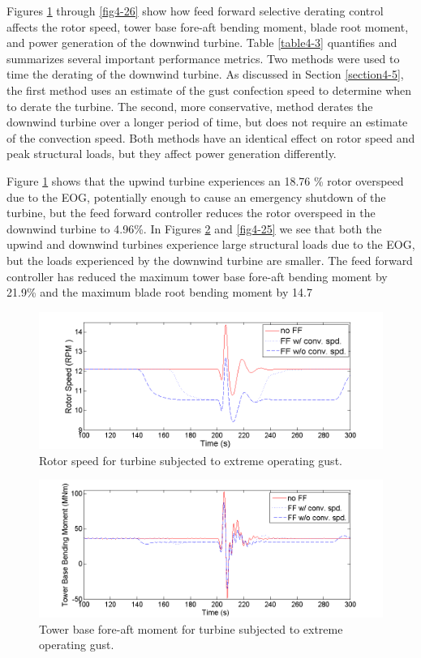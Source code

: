 Figures \ref{fig4-23} through \ref{fig4-26} show how feed forward selective derating control affects the rotor speed, tower base fore-aft bending moment, blade root moment, and power generation of the downwind turbine. Table \ref{table4-3} quantifies and summarizes several important performance metrics. Two methods were used to time the derating of the downwind turbine. As discussed in Section \ref{section4-5}, the first method uses an estimate of the gust confection speed to determine when to derate the turbine. The second, more conservative,  method derates the downwind turbine over a longer period of time, but does not require an estimate of the convection speed. Both methods have an identical effect on rotor speed and peak structural loads, but they affect power generation differently. 

Figure \ref{fig4-23} shows that the upwind turbine experiences an 18.76 \% rotor overspeed due to the EOG, potentially enough to cause an emergency shutdown of the turbine, but the feed forward controller reduces the rotor overspeed in the downwind turbine to 4.96\%. In Figures \ref{fig4-24} and \ref{fig4-25} we see that both the upwind and downwind turbines experience large structural loads due to the EOG, but the loads experienced by the downwind turbine are smaller. The feed forward controller has reduced the maximum tower base fore-aft bending moment by 21.9\% and the maximum blade root bending moment by 14.7%

\begin{figure}[htbp]
	\centering
		\includegraphics[trim = {1cm 0 2cm 0}, clip, width = \linewidth]{Figures/ch4Figures/fig4-23.png}
		
	\caption{Rotor speed for turbine subjected to extreme operating gust.}
	\label{fig4-23}
\end{figure}

\begin{figure}[htbp]
	\centering
		\includegraphics[trim = {1cm 0 2cm 0}, clip, width = \linewidth]{Figures/ch4Figures/fig4-24.png}
		
	\caption{Tower base fore-aft moment for turbine subjected to extreme operating gust.}
	\label{fig4-24}
\end{figure}

